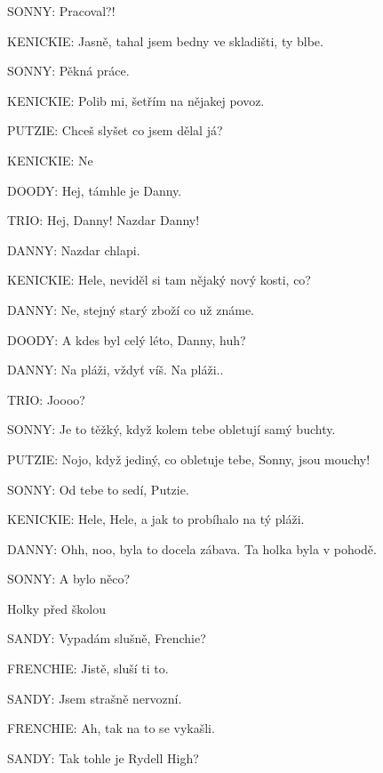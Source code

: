 \rep SONNY:        Pracoval?!

\rep KENICKIE:                Jasně, tahal jsem bedny ve skladišti, ty blbe.

\rep SONNY:                Pěkná práce. 

\rep KENICKIE:                Polib mi, šetřím na nějakej povoz.

\rep PUTZIE:                Chceš slyšet co jsem dělal já?

\rep KENICKIE:                 Ne

\rep DOODY:                Hej, támhle je Danny.

\rep TRIO:                Hej, Danny! Nazdar Danny! 

\rep DANNY:                 Nazdar chlapi. 

\rep KENICKIE:                Hele, neviděl si tam nějaký nový kosti, co?

\rep DANNY:                Ne, stejný starý zboží co už známe.

\rep DOODY:                A kdes byl celý léto, Danny, huh?

\rep DANNY:                Na pláži, vždyť víš. Na pláži..

\rep TRIO:                Joooo?

\rep SONNY:                Je to těžký, když kolem tebe obletují samý buchty.

\rep PUTZIE:                Nojo, když jediný, co obletuje tebe, Sonny, jsou mouchy!

\rep SONNY:                Od tebe to sedí, Putzie.

\rep KENICKIE:                Hele, Hele, a jak to probíhalo na tý pláži. 

\rep DANNY:                Ohh, noo, byla to docela zábava. Ta holka byla v pohodě.

\rep SONNY:                A bylo něco?



\scene Holky před školou


\rep SANDY:                Vypadám slušně, Frenchie?

\rep FRENCHIE:                Jistě, sluší ti to.

\rep SANDY:                Jsem strašně nervozní.

\rep FRENCHIE:                Ah, tak na to se vykašli.

\rep SANDY:                Tak tohle je Rydell High?

